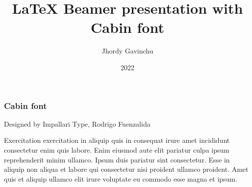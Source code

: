 \documentclass{beamer}
\title{LaTeX Beamer presentation with Cabin font}
\author{Jhordy Gavinchu}
\institute{\href{https://jhordyess.com}{Jhordyess}}
\date{2022}
\begin{document}
\frame{\titlepage}

\begin{frame}
\frametitle{Cabin font}
Designed by Impallari Type, Rodrigo Fuenzalida
\href{https://fonts.google.com/specimen/Cabin/tester}{}
\end{frame}

\begin{frame}
  Exercitation exercitation in aliquip quis in consequat irure amet incididunt consectetur enim quis labore. Enim eiusmod aute elit pariatur culpa ipsum reprehenderit minim ullamco. Ipsum duis pariatur sint consectetur. Esse in aliquip non aliqua et labore qui consectetur nisi proident ullamco proident. Amet quis et aliquip ullamco elit irure voluptate eu commodo esse magna et ipsum.
\end{frame}
\end{document}
